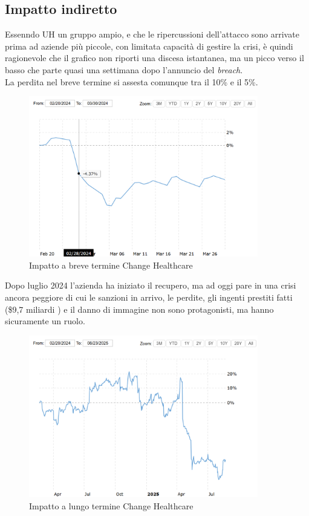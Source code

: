 \documentclass[12pt,a4paper,openright,twoside]{report}
\begin{document}
\subsection{Impatto indiretto}
Essenndo UH un gruppo ampio, e che le ripercussioni dell'attacco sono arrivate prima ad aziende pi\`u piccole, con limitata capacit\`a di gestire la crisi, \`e quindi ragionevole che il grafico non riporti una discesa istantanea, ma un picco verso il basso che parte quasi una settimana dopo l'annuncio del \textit{breach}.\\
La perdita nel breve termine si assesta comunque tra il 10\% e il 5\%.\\
\begin{figure}[H] 
\begin{center} 
\includegraphics[width=10cm]{figures/chHealth_short.png} 
\caption[Grafico Change Healthcare short]{Impatto a breve termine Change Healthcare}\label{fig:chh1}
\end{center}
\end{figure}

Dopo luglio 2024 l'azienda ha iniziato il recupero, ma ad oggi pare in una crisi ancora peggiore di cui le sanzioni in arrivo, le perdite, gli ingenti prestiti fatti (\$9,7 miliardi \cite{ChHealth_lessons}) e il danno di immagine non sono protagonisti, ma hanno sicuramente un ruolo.\\

\begin{figure}[H] 
\begin{center} 
\includegraphics[width=10cm]{figures/chHealth_long.png} 
\caption[Grafico Change Healthcare long]{Impatto a lungo termine  Change Healthcare}\label{fig:chh2}
\end{center}
\end{figure}
\end{document}
